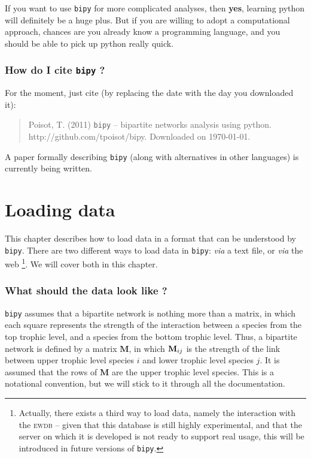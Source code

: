 \documentclass[nols,b5paper]{tufte-book}
\begin{document}
If you want to use \texttt{bipy} for more complicated analyses, then \textbf{yes}, learning python will definitely be a huge plus. But if you are willing to adopt a computational approach, chances are you already know a programming language, and you should be able to pick up python really quick.

\subsection{How do I cite \texttt{bipy} ?}

For the moment, just cite (by replacing the date with the day you downloaded it):

\begin{quote}
	Poisot, T. (2011) \texttt{bipy} -- bipartite networks analysis using python. http://github.com/tpoisot/bipy. Downloaded on \today.
\end{quote}

A paper formally describing \texttt{bipy} (along with alternatives in other languages) is currently being written.

\chapter{Loading data}

This chapter describes how to load data in a format that can be understood by \texttt{bipy}. There are two different ways to load data in \texttt{bipy}: \emph{via} a text file, or \emph{via} the web \footnote{Actually, there exists a third way to load data, namely the interaction with the \textsc{ewdb} -- given that this database is still highly experimental, and that the server on which it is developed is not ready to support real usage, this will be introduced in future versions of \texttt{bipy}. }. We will cover both in this chapter.

\subsection{What should the data look like ?}

\texttt{bipy} assumes that a bipartite network is nothing more than a matrix, in which each square represents the strength of the interaction between a species from the top trophic level, and a species from the bottom trophic level. Thus, a bipartite network is defined by a matrix $\mathbf{M}$, in which $\mathbf{M}\sb{ij}$ is the strength of the link between upper trophic level species $i$ and lower trophic level species $j$. It is assumed that the rows of $\mathbf{M}$ are the upper trophic level species. This is a notational convention, but we will stick to it through all the documentation.
\end{document}
